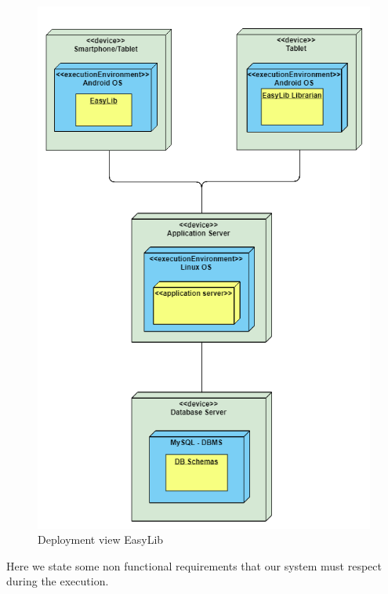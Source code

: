 \vspace*{0cm}
\begin{figure}[H]
	\centering
	\includegraphics[scale=0.55]{Images/Diagrams/Deployment_view_EasyLib}
	\caption{Deployment view EasyLib}
\end{figure}

Here we state some non functional requirements that our system must respect during the execution.

